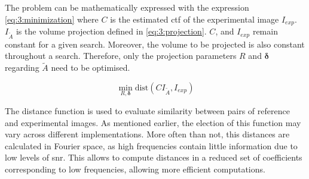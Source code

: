 \documentclass[../main.tex]{subfiles}
\begin{document}
The problem can be mathematically expressed with the expression \eqref{eq:3:minimization} where $C$ is the estimated \gls{ctf} of the experimental image $I_{exp}$. $I_{\tilde{A}}$ is the volume projection defined in \eqref{eq:3:projection}. $C$, and $I_{exp}$ remain constant for a given search. Moreover, the volume to be projected is also constant throughout a search. Therefore, only the projection parameters $R$ and $\bm{\delta}$ regarding $\tilde{A}$ need to be optimised.

\begin{equation}\label{eq:3:minimization}
    \min_{R, \bm{\delta}} \text{dist}(C I_{\tilde{A}} , I_{exp})
\end{equation}

The distance function is used to evaluate similarity between pairs of reference and experimental images. As mentioned earlier, the election of this function may vary across different implementations. More often than not, this distances are calculated in Fourier space, as high frequencies contain little information due to low levels of \gls{snr}. This allows to compute distances in a reduced set of coefficients corresponding to low frequencies, allowing more efficient computations.
\end{document}
